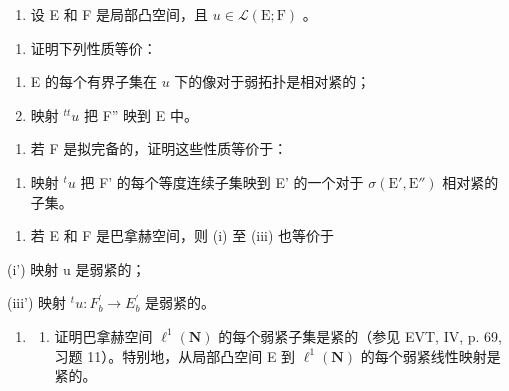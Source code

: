 \begin{enumerate}
\def\labelenumi{\arabic{enumi})}
\setcounter{enumi}{27}
\tightlist
\item
  设 E 和 F 是局部凸空间，且 \(u \in \mathcal{L}(\mathrm{E};\mathrm{F})\) 。
\end{enumerate}

\begin{enumerate}
\def\labelenumi{\alph{enumi})}
\tightlist
\item
  证明下列性质等价：
\end{enumerate}

\begin{enumerate}
\def\labelenumi{(\roman{enumi})}
\item
  E 的每个有界子集在 \(u\) 下的像对于弱拓扑是相对紧的；
\item
  映射 \(^{tt}u\) 把 F'' 映到 E 中。
\end{enumerate}

\begin{enumerate}
\def\labelenumi{\alph{enumi})}
\setcounter{enumi}{1}
\tightlist
\item
  若 F 是拟完备的，证明这些性质等价于：
\end{enumerate}

\begin{enumerate}
\def\labelenumi{(\roman{enumi})}
\setcounter{enumi}{2}
\tightlist
\item
  映射 \(^{t}u\) 把 F' 的每个等度连续子集映到 E' 的一个对于 \(\sigma(\mathrm{E}',\mathrm{E}'')\) 相对紧的子集。
\end{enumerate}

\begin{enumerate}
\def\labelenumi{\alph{enumi})}
\setcounter{enumi}{2}
\tightlist
\item
  若 E 和 F 是巴拿赫空间，则 (i) 至 (iii) 也等价于
\end{enumerate}

(i') 映射 u 是弱紧的；

(iii') 映射 \(^{t}u\colon F_{b}^{\prime}\to E_{b}^{\prime}\) 是弱紧的。

\begin{enumerate}
\def\labelenumi{\arabic{enumi})}
\setcounter{enumi}{28}
\tightlist
\item
  \begin{enumerate}
  \def\labelenumii{\alph{enumii})}
  \tightlist
  \item
    证明巴拿赫空间 \(\ell^{1}(\mathbf{N})\) 的每个弱紧子集是紧的（参见 EVT, IV, p. 69, 习题 11）。特别地，从局部凸空间 E 到 \(\ell^{1}(\mathbf{N})\) 的每个弱紧线性映射是紧的。
  \end{enumerate}
\end{enumerate}

